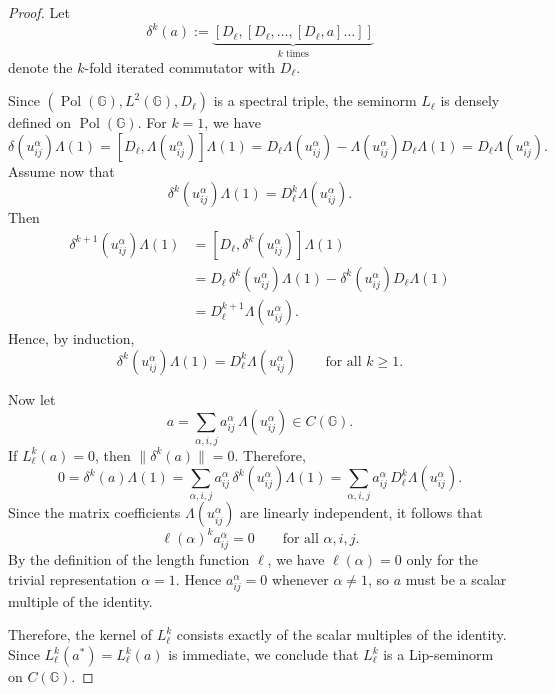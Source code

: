 \documentclass[12pt, reqno]{amsart}
\theoremstyle{definition}
\theoremstyle{remark}
\numberwithin{equation}{section}
\begin{document}
\begin{proof}
    Let
    \[
        \delta^k(a):=\underbrace{[D_\ell,[D_\ell,\dots,[D_\ell,a]\dots]]}_{k\text{ times}}
    \]
    denote the $k$-fold iterated commutator with $D_\ell$.

    Since $(\operatorname{Pol}(\mathbb{G}),L^2(\mathbb{G}),D_\ell)$ is a spectral triple,
    the seminorm $L_\ell$ is densely defined on $\operatorname{Pol}(\mathbb{G})$.
    For $k=1$, we have
    \[
        \delta(u_{ij}^\alpha)\Lambda(1)
        =[D_\ell,\Lambda(u_{ij}^\alpha)]\Lambda(1)
        =D_\ell \Lambda(u_{ij}^\alpha)-\Lambda(u_{ij}^\alpha)D_\ell \Lambda(1)
        =D_\ell \Lambda(u_{ij}^\alpha).
    \]
    Assume now that
    \[
        \delta^k(u_{ij}^\alpha)\Lambda(1)=D_\ell^k \Lambda(u_{ij}^\alpha).
    \]
    Then
    \begin{align*}
        \delta^{k+1}(u_{ij}^\alpha)\Lambda(1)
        &= [D_\ell,\delta^k(u_{ij}^\alpha)]\Lambda(1) \\
        &= D_\ell\,\delta^k(u_{ij}^\alpha)\Lambda(1)-\delta^k(u_{ij}^\alpha)D_\ell\Lambda(1) \\
        &= D_\ell^{k+1}\Lambda(u_{ij}^\alpha).
    \end{align*}
    Hence, by induction,
    \[
        \delta^k(u_{ij}^\alpha)\Lambda(1)=D_\ell^k \Lambda(u_{ij}^\alpha)
        \qquad \text{for all } k\geq 1.
    \]

    Now let
    \[
        a=\sum_{\alpha,i,j} a_{ij}^\alpha\, \Lambda(u_{ij}^\alpha)\in C(\mathbb{G}).
    \]
    If $L_\ell^k(a)=0$, then $\|\delta^k(a)\|=0$. Therefore,
    \[
        0=\delta^k(a)\Lambda(1)
        =\sum_{\alpha,i,j} a_{ij}^\alpha\, \delta^k(u_{ij}^\alpha)\Lambda(1)
        =\sum_{\alpha,i,j} a_{ij}^\alpha\, D_\ell^k\Lambda(u_{ij}^\alpha).
    \]
    Since the matrix coefficients $\Lambda(u_{ij}^\alpha)$ are linearly independent, it follows that
    \[
        \ell(\alpha)^k a_{ij}^\alpha=0
        \qquad \text{for all } \alpha,i,j.
    \]
    By the definition of the length function $\ell$, we have $\ell(\alpha)=0$ only for the trivial representation $\alpha=1$.
    Hence $a_{ij}^\alpha=0$ whenever $\alpha\neq 1$, so $a$ must be a scalar multiple of the identity.

    Therefore, the kernel of $L_\ell^k$ consists exactly of the scalar multiples of the identity.
    Since $L_\ell^k(a^*)=L_\ell^k(a)$ is immediate, we conclude that $L_\ell^k$ is a Lip-seminorm on $C(\mathbb{G})$.
\end{proof}
\end{document}

